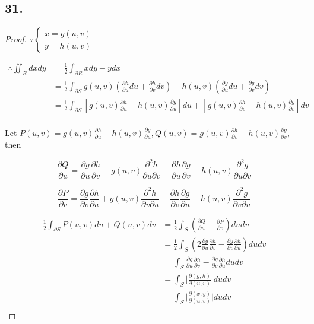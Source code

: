 \documentclass{article}
\begin{document}
  \subsection*{31. }

  \begin{proof}

    $\because \left\{ \begin{array}{ll} x = g(u, v) \\ y = h(u, v) \end{array}\right.$

    $$\begin{aligned}
      \therefore \iint_R dx dy &= \frac 1 2 \int_{\partial R} xdy - ydx \\
      &= \frac 1 2 \int_{\partial S} g(u, v) (\frac{\partial h}{\partial u} du + \frac{\partial h}{\partial v} dv) - h(u, v) (\frac{\partial g}{\partial u} du + \frac{\partial g}{\partial v} dv) \\
      &= \frac 1 2 \int_{\partial S} [g(u, v)\frac{\partial h}{\partial u} - h(u, v) \frac{\partial g}{\partial u}] du + [g(u, v) \frac{\partial h}{\partial v} - h(u, v) \frac{\partial g}{\partial v}] dv \\
    \end{aligned}$$

    Let $P(u, v) = g(u, v)\frac{\partial h}{\partial u} - h(u, v)\frac{\partial g}{\partial u}, Q(u, v) = g(u, v) \frac{\partial h}{\partial v} - h(u, v) \frac{\partial g}{\partial v}$, then

    $$\frac{\partial Q}{\partial u} = \frac{\partial g}{\partial u}\frac{\partial h}{\partial v} + g(u, v)\frac{\partial^2 h}{\partial u \partial v} - \frac{\partial h}{\partial u}\frac{\partial g}{\partial v} - h(u, v) \frac{\partial^2 g}{\partial u \partial v}$$

    $$\frac{\partial P}{\partial v} = \frac{\partial g}{\partial v}\frac{\partial h}{\partial u} + g(u, v)\frac{\partial^2 h}{\partial v \partial u} - \frac{\partial h}{\partial v}\frac{\partial g}{\partial u} - h(u, v) \frac{\partial^2 g}{\partial v \partial u}$$

    $$\begin{aligned}
      \frac 1 2 \int_{\partial S} P(u, v) du + Q(u, v) dv &= \frac 1 2 \int_S (\frac{\partial Q}{\partial u} - \frac{\partial P}{\partial v}) du dv \\
      &= \frac 1 2 \int_S (2\frac{\partial g}{\partial u} \frac{\partial h}{\partial v} - \frac{\partial g}{\partial v}\frac{\partial h}{\partial u}) du dv \\
      &= \int_S \frac{\partial g}{\partial u} \frac{\partial h}{\partial v} - \frac{\partial g}{\partial v}\frac{\partial h}{\partial u} du dv \\
      &= \int_S \biggl| \frac{\partial(g, h)}{\partial (u, v)} \biggl| du dv \\
      &= \int_S \biggl| \frac{\partial(x, y)}{\partial (u, v)} \biggl| du dv \\
    \end{aligned}$$
  
  \end{proof}
\end{document}
